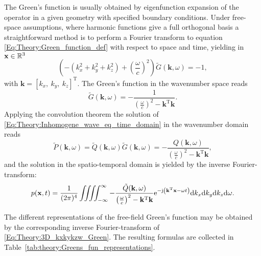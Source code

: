 The Green's function is usually obtained by eigenfunction expansion of the operator in a given geometry with specified boundary conditions. Under free-space assumptions, where harmonic functions give a full orthogonal basis a straightforward method is to perform a Fourier transform to equation \eqref{Eq:Theory:Green_function_def} with respect to space and time, yielding in $\mathbf{x} \in \mathbb{R}^{3}$
\begin{equation}
(-(k_x^2 + k_y^2 + k_z^2) + \left(\frac{\omega}{c} \right)^2)\tilde{G}(\mathbf{k},\omega) = -1,
\end{equation}
with $\mathbf{k} = [k_x,\ k_y,\ k_z]^{\mathrm{T}}$.
The Green's function in the wavenumber space reads \cite{Devaney2012, Watanabe2015}
\begin{equation}
\tilde{G}(\mathbf{k},\omega) = -\frac{1}{\left( \frac{\omega}{c}\right)^2 - \mathbf{k}^{\mathrm{T}} \mathbf{k}}.
\label{Eq:Theory:3D_kxkykzw_Green}
\end{equation}
Applying the convolution theorem the solution of \eqref{Eq:Theory:Inhomogene_wave_eq_time_domain} in the wavenumber domain reads
\begin{equation}
\tilde{P}(\mathbf{k},\omega)  = \tilde{Q}(\mathbf{k},\omega) \tilde{G}(\mathbf{k},\omega) = -\frac{Q	(\mathbf{k},\omega)}{\left( \frac{\omega}{c}\right)^2 -  \mathbf{k}^{\mathrm{T}} \mathbf{k} },
\end{equation}
and the solution in the spatio-temporal domain is yielded by the inverse Fourier-transform:
\begin{equation}
p(\mathbf{x},t) =\frac{1}{(2\pi)^4} \iiiint^{\infty}_{-\infty} - \frac{\tilde{Q}(\mathbf{k},\omega)}{\left( \frac{\omega}{c}\right)^2 -  \mathbf{k}^{\mathrm{T}} \mathbf{k} } \mathrm{e}^{-\mathrm{j} \left( \mathbf{k}^{\mathrm{T}}\mathbf{x} - \omega t \right) } \mathrm{d} k_x \mathrm{d} k_y \mathrm{d} k_z \mathrm{d} \omega.
\end{equation}

The different representations of the free-field Green's function may be obtained by the corresponding inverse Fourier-transform of \eqref{Eq:Theory:3D_kxkykzw_Green}.
The resulting formulas are collected in Table\ \ref{tab:theory:Greens_fun_representations}.

